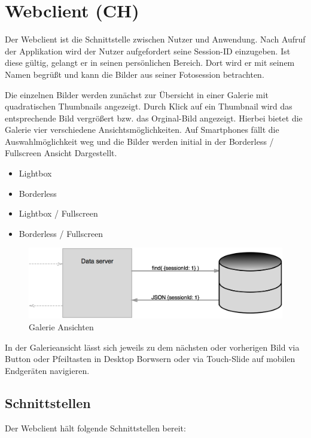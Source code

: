 \section{Webclient (CH)}
\label{section_webclient}
Der Webclient ist die Schnittstelle zwischen Nutzer und Anwendung. Nach Aufruf der Applikation wird der Nutzer aufgefordert seine Session-ID einzugeben. Ist diese gültig, gelangt er in seinen persönlichen Bereich. Dort wird er mit seinem Namen begrüßt und kann die Bilder aus seiner Fotosession betrachten. 

Die einzelnen Bilder werden zunächst zur Übersicht in einer Galerie mit quadratischen Thumbnails angezeigt. Durch Klick auf ein Thumbnail wird das entsprechende Bild vergrößert bzw. das Orginal-Bild angezeigt. Hierbei bietet die Galerie vier verschiedene Ansichtsmöglichkeiten. Auf Smartphones fällt die Auswahlmöglichkeit weg und die Bilder werden initial in der Borderless / Fullscreen Ansicht Dargestellt. 

\begin{itemize}
	\item Lightbox
	\item Borderless
	\item Lightbox / Fullscreen
	\item Borderless / Fullscreen
\end{itemize}

\begin{figure}[h]
	\centering
	\includegraphics[width=14cm]{bilder/abbildung_datenbank}
	\caption{Galerie Ansichten}
	\label{fig_galerie_ansichten}
\end{figure}

In der Galerieansicht lässt sich jeweils zu dem nächsten oder vorherigen Bild via Button oder Pfeiltasten in Desktop Borwsern oder via Touch-Slide auf mobilen Endgeräten navigieren. 

\subsection{Schnittstellen}
Der Webclient hält folgende Schnittstellen bereit:

